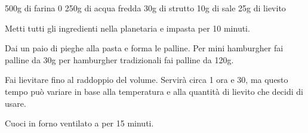 \begin{ingreds}
	500g di farina 0
	250g di acqua fredda
	30g di strutto
	10g di sale
	25g di lievito
\end{ingreds}

\begin{method}
	Metti tutti gli ingredienti nella planetaria e impasta per 10 minuti.

	Dai un paio di pieghe alla pasta e forma le palline. Per mini hamburgher fai palline da 30g per hamburgher tradizionali fai palline da 120g.

	Fai lievitare fino al raddoppio del volume. Servirà circa 1 ora e 30, ma questo tempo può variare in base alla temperatura e alla quantità di lievito che decidi di usare.

	Cuoci in forno ventilato a  per 15 minuti.

\end {method}

